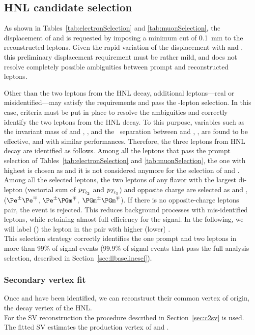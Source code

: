 \subsection{HNL candidate selection}
As shown in Tables~\ref{tab:electronSelection} and
\ref{tab:muonSelection},
the displacement of \ltwo and \lthree is requested by imposing a
minimum \absdxy cut of 0.1~mm to the reconstructed leptons.
Given the rapid variation of the \hnl displacement with \mhnl and
\mixpar, this preliminary displacement requirement must be rather
mild, and does not resolve completely possible ambiguities between
prompt and \displ reconstructed leptons.

Other than the two leptons from the HNL decay, additional
leptons---real or misidentified---may satisfy the \absdxy requirements
and pass the \displ-lepton selection. In this case, criteria must
be put in place to resolve the ambiguities and correctly identify the
two leptons from the HNL decay.
To this purpose, variables such as the invariant mass of \ltwo and
\lthree, \mtwol, and the \DR\ separation between \ltwo and \lthree, \DRtwol, are found to be
effective, and with similar performances.
Therefore, the three leptons from HNL decay are identified as follows.
Among all the leptons that pass the prompt selection of
Tables~\ref{tab:electronSelection} and \ref{tab:muonSelection}, the one
with highest \pt is chosen as \lone and it is not considered anymore for the selection of \ltwo and \lthree.
Among all the selected \displ leptons, the two leptons of any
flavor with the largest di-lepton \pt (vectorial sum of $p_{T_{\ell_2}}$
and $p_{T_{\ell_3}}$) and opposite charge are selected
as \ltwo and \lthree,
($\Pe^\pm\Pe^\mp$, $\Pe^\pm\PGm^\mp$, $\PGm^\pm\PGm^\mp$).
If there is no opposite-charge \displ leptons pair, the
event is rejected. This reduces background processes with
mis-identified leptons, while retaining almost full efficiency for the
signal. In the following, we will label \ltwo (\lthree) the lepton in
the pair with higher (lower) \pt.\\
This selection strategy correctly identifies the one prompt and two
\displ leptons in more than 99\% of signal events (99.9\% of
signal events that pass the full analysis selection, described in
Section~\ref{sec:llbaselinesel}).

\subsubsection{Secondary vertex fit}

Once \ltwo and \lthree have been identified, we can reconstruct their
common vertex of origin, \ie the decay vertex of the HNL. \\
For the SV reconstruction the procedure described in Section~\ref{sec:c2sv} is used.
The fitted SV estimates the production vertex of \ltwo and \lthree.

